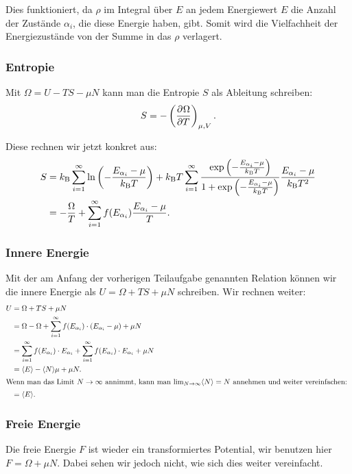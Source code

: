 Dies funktioniert, da $\rho$ im Integral über $E$ an jedem Energiewert $E$ die
Anzahl der Zustände $\alpha_i$, die diese Energie haben, gibt. Somit wird die
Vielfachheit der Energiezustände von der Summe in das $\rho$ verlagert.

\subsubsection{Entropie}

Mit $\Omega = U - TS - \mu N$ kann man die Entropie $S$ als Ableitung schreiben:
\[
    S = - \tdpd\Omega T{\mu, V}.
\]

Diese rechnen wir jetzt konkret aus:
\begin{align*}
    S &= \kB \isum \ln\del{- \frac{\Eai - \mu}{\kB T}} + \kB T \isum
    \frac{\exp\del{- \frac{\Eai - \mu}{\kB T}}}{1 + \exp\del{- \frac{\Eai -
    \mu}{\kB T}}} \frac{\Eai - \mu}{\kB T^2} \\
      &= - \frac\Omega T + \isum f(\Eai) \frac{\Eai - \mu}T.
\end{align*}

\subsubsection{Innere Energie}

Mit der am Anfang der vorherigen Teilaufgabe genannten Relation können wir die innere Energie als $U = \Omega + TS + \mu N$ schreiben. Wir rechnen weiter:
\begin{align*}
    U &= \Omega + TS + \mu N \\
      &= \Omega - \Omega + \isum f(\Eai) \cdot (\Eai - \mu) + \mu N \\
      &= \isum f(\Eai) \cdot \Eai + \isum f(\Eai) \cdot \Eai + \mu N \\
      &= \bracket E - \bracket N \mu + \mu N. \\
    \intertext{%
        Wenn man das Limit $N \to \infty$ annimmt, kann man $\lim_{N\to\infty}
        \bracket N = N$ annehmen und weiter vereinfachen:
    }
      &= \bracket E.
\end{align*}

\subsubsection{Freie Energie}

Die freie Energie $F$ ist wieder ein transformiertes Potential, wir benutzen
hier $F = \Omega + \mu N$. Dabei sehen wir jedoch nicht, wie sich dies weiter
vereinfacht.


